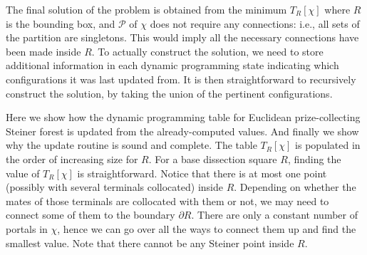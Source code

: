 \documentclass[extras,11pt]{article} \usepackage{fullpage}
\theoremstyle{mytheorem}
\begin{document}
The final solution of the problem is obtained from the minimum $T_R[\chi]$ where $R$ is the bounding box, and $\mathcal{P}$ of $\chi$ does not require any connections: i.e., all sets of the partition are singletons.
This would imply all the necessary connections have been made inside $R$.
To actually construct the solution, we need to store additional information in each dynamic programming state indicating which configurations it was last updated from.
It is then straightforward to recursively construct the solution, by taking the union of the pertinent configurations.






Here we show how the dynamic programming table for Euclidean prize-collecting Steiner forest 
is updated from the already-computed values.
And finally we show why the update routine is sound and complete.
The table $T_R[\chi]$ is populated in the order of increasing size for $R$.
For a base dissection square $R$, finding the value of $T_R[\chi]$ is straightforward.
Notice that there is at most one point (possibly with several terminals collocated) inside $R$.
Depending on whether the mates of those terminals are collocated with them or not, we may need to connect some of them to the boundary $\partial R$.
There are only a constant number of portals in $\chi$, hence we can go over all the ways to connect them up and find the smallest value.
Note that there cannot be any Steiner point inside $R$.
\end{document}
